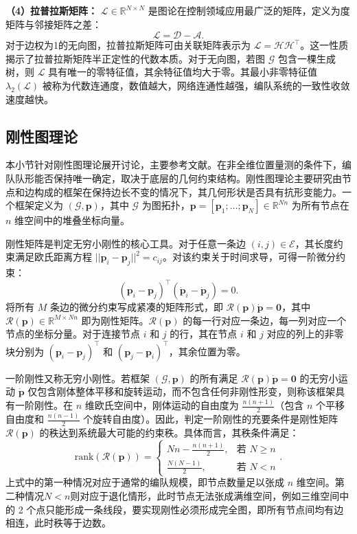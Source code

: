 \textbf{（4）拉普拉斯矩阵：} $\mathcal{L} \in \mathbb{R}^{N \times N}$ 是图论在控制领域应用最广泛的矩阵，定义为度矩阵与邻接矩阵之差：
\begin{equation}
	\mathcal{L} = \mathcal{D} - \mathcal{A}.
\end{equation}
对于边权为1的无向图，拉普拉斯矩阵可由关联矩阵表示为 $\mathcal{L} = \mathcal{H} \mathcal{H}^\top$。这一性质揭示了拉普拉斯矩阵半正定性的代数本质。对于无向图，若图 $\mathcal{G}$ 包含一棵生成树，则 $\mathcal{L}$ 具有唯一的零特征值，其余特征值均大于零。其最小非零特征值 $\lambda_2(\mathcal{L})$ 被称为代数连通度，数值越大，网络连通性越强，编队系统的一致性收敛速度越快。

\subsection{刚性图理论}
本小节针对刚性图理论展开讨论，主要参考\parencite{Hendrickson1992Conditions,Anderson2010FormalTO}文献。在非全维位置量测的条件下，编队队形能否保持唯一确定，取决于底层的几何约束结构。刚性图理论主要研究由节点和边构成的框架在保持边长不变的情况下，其几何形状是否具有抗形变能力。一个框架定义为 $(\mathcal{G}, \mathbf{p})$，其中 $\mathcal{G}$ 为图拓扑，$\mathbf{p}=[\mathbf{p}_1;\dots;\mathbf{p}_N] \in \mathbb{R}^{Nn}$ 为所有节点在 $n$ 维空间中的堆叠坐标向量。

刚性矩阵是判定无穷小刚性的核心工具。对于任意一条边 $(i, j) \in \mathcal{E}$，其长度约束满足欧氏距离方程 $||\mathbf{p}_i - \mathbf{p}_j||^2 = c_{ij}$。对该约束关于时间求导，可得一阶微分约束：
\begin{equation}
	(\mathbf{p}_i - \mathbf{p}_j)^\top (\dot{\mathbf{p}}_i - \dot{\mathbf{p}}_j) = 0.
\end{equation}
将所有 $M$ 条边的微分约束写成紧凑的矩阵形式，即 $\mathcal{R}(\mathbf{p}) \dot{\mathbf{p}} = \mathbf{0}$，其中 $\mathcal{R}(\mathbf{p}) \in \mathbb{R}^{M \times Nn}$ 即为刚性矩阵。$\mathcal{R}(\mathbf{p})$ 的每一行对应一条边，每一列对应一个节点的坐标分量。对于连接节点 $i$ 和 $j$ 的行，其在节点 $i$ 和 $j$ 对应的列上的非零块分别为 $(\mathbf{p}_i - \mathbf{p}_j)^\top$ 和 $(\mathbf{p}_j - \mathbf{p}_i)^\top$，其余位置为零。

一阶刚性又称无穷小刚性。若框架 $(\mathcal{G}, \mathbf{p})$ 的所有满足 $\mathcal{R}(\mathbf{p}) \dot{\mathbf{p}} = \mathbf{0}$ 的无穷小运动 $\dot{\mathbf{p}}$ 仅包含刚体整体平移和旋转运动，而不包含任何非刚性形变，则称该框架具有一阶刚性。在 $n$ 维欧氏空间中，刚体运动的自由度为 $\frac{n(n+1)}{2}$（包含 $n$ 个平移自由度和 $\frac{n(n-1)}{2}$ 个旋转自由度）。因此，判定一阶刚性的充要条件是刚性矩阵 $\mathcal{R}(\mathbf{p})$ 的秩达到系统最大可能的约束秩。具体而言，其秩条件满足：
\begin{equation}
	\text{rank}(\mathcal{R}(\mathbf{p})) = 
	\begin{cases}
		Nn - \frac{n(n+1)}{2}, & \text{若 } N \ge n \\
		\frac{N(N-1)}{2}, & \text{若 } N < n
	\end{cases}.
	\label{刚性矩阵秩条件}
\end{equation}
上式中的第一种情况对应于通常的编队规模，即节点数量足以张成 $n$ 维空间。第二种情况$ N < n$则对应于退化情形，此时节点无法张成满维空间，例如三维空间中的 2 个点只能形成一条线段，要实现刚性必须形成完全图，即所有节点间均有边相连，此时秩等于边数。


